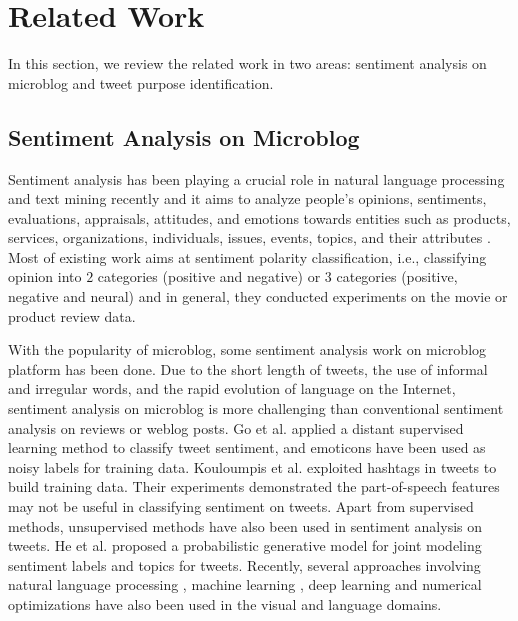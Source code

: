 \documentclass[letterpaper]{article}
\begin{document}
\section{Related Work}
\label{sec:related}
In this section, we review the related work in two areas: sentiment analysis on microblog and tweet purpose identification.

\subsection{Sentiment Analysis on Microblog}
\label{subsec:microblog}
Sentiment analysis has been playing a crucial role in natural language processing and text mining recently and it aims to analyze people’s opinions, sentiments, evaluations, appraisals, attitudes, and emotions towards entities such as products, services, organizations, individuals, issues, events, topics, and their attributes \cite{liu2012sentiment}. Most of existing work aims at sentiment polarity classification, i.e., classifying opinion into $2$ categories (positive and negative) or $3$ categories (positive, negative and neural) and in general, they conducted experiments on the movie or product review data.

With the popularity of microblog, some sentiment analysis work on microblog platform has been done. Due to the short length of tweets, the use of informal and irregular words, and the rapid evolution of language \cite{saif2012alleviating} on the Internet, sentiment analysis on microblog is more challenging than conventional sentiment analysis on reviews or weblog posts. Go et al. \cite{go2009twitter} applied a distant supervised learning method to classify tweet sentiment, and emoticons have been used as noisy labels for training data. Kouloumpis et al. \cite{kouloumpis2011twitter} exploited hashtags in tweets to build training data. Their experiments demonstrated the part-of-speech features may not be useful in classifying sentiment on tweets. Apart from supervised methods, unsupervised methods have also been used in sentiment analysis on tweets. He et al. \cite{he2012quantising} proposed a probabilistic generative model for joint modeling sentiment labels and topics for tweets. Recently, several approaches involving natural language processing \cite{iyer2019event,iyer2019unsupervised,iyer2019heterogeneous,iyer2017detecting,iyer2019machine,iyer2017recomob}, machine learning \cite{li2016joint,iyer2016content,honke2018photorealistic}, deep learning \cite{iyer2018transparency,li2018object} and numerical optimizations \cite{radhakrishnan2016multiple,iyer2012optimal,qian2014parallel,gupta2016analysis,radhakrishnan2018new} have also been used in the visual and language domains.
\end{document}
